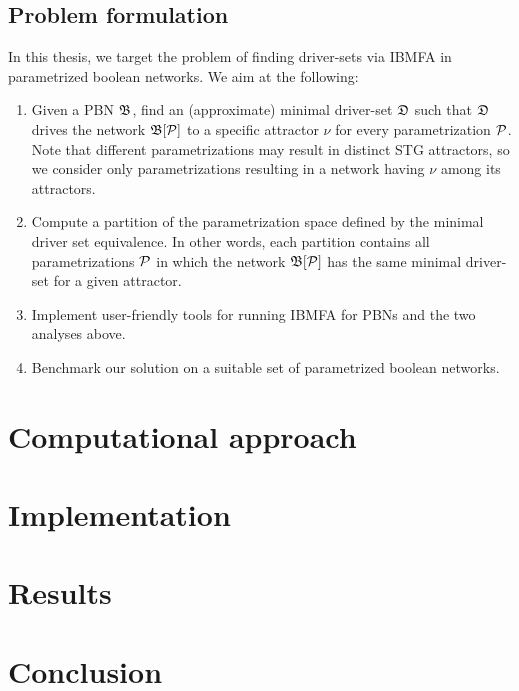 \documentclass[
	digital, oneside, nosansbold, nocolorbold, nolot, nolof
]{fithesis4}
\theoremstyle{definition}
\theoremstyle{definition}
\begin{document}
\section{Problem formulation}
In this thesis, we target the problem of finding driver-sets via IBMFA in
parametrized boolean networks. We aim at the following:
\begin{enumerate}
    \item Given a PBN $\mathfrak{B}$, find an (approximate) minimal driver-set
        $\mathfrak{D}$ such that $\mathfrak{D}$ drives the network $\mathfrak{B}[\mathcal{P}]$
        to a specific attractor $\nu$ for every parametrization $\mathcal{P}$.
        Note that different parametrizations may result in distinct STG
        attractors, so we consider only parametrizations resulting in a network
        having $\nu$ among its attractors.
    \item Compute a partition of the parametrization space defined by the
        minimal driver set equivalence. In other words, each partition contains
        all parametrizations $\mathcal{P}$ in which the network
        $\mathfrak{B}[\mathcal{P}]$ has the same minimal driver-set for a given
        attractor.
    \item Implement user-friendly tools for running IBMFA for PBNs and the two
        analyses above.
    \item Benchmark our solution on a suitable set of parametrized boolean
        networks.
\end{enumerate}

\chapter{Computational approach}

\chapter{Implementation}

\chapter{Results}

\chapter{Conclusion}



\end{document}
